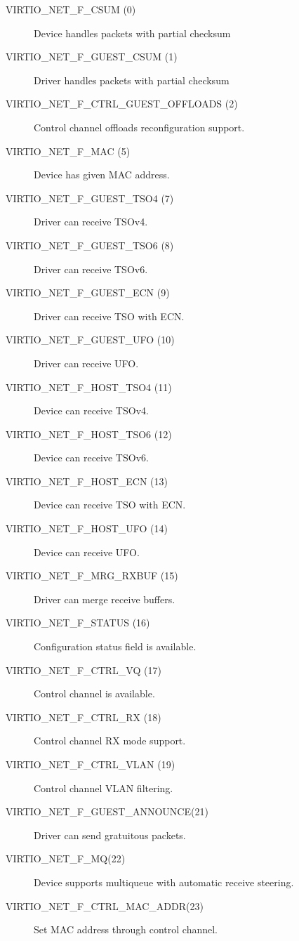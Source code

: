 \begin{description}
\item[VIRTIO_NET_F_CSUM (0)] Device handles packets with partial checksum

\item[VIRTIO_NET_F_GUEST_CSUM (1)] Driver handles packets with partial checksum

\item[VIRTIO_NET_F_CTRL_GUEST_OFFLOADS (2)] Control channel offloads
        reconfiguration support.

\item[VIRTIO_NET_F_MAC (5)] Device has given MAC address.

\item[VIRTIO_NET_F_GUEST_TSO4 (7)] Driver can receive TSOv4.

\item[VIRTIO_NET_F_GUEST_TSO6 (8)] Driver can receive TSOv6.

\item[VIRTIO_NET_F_GUEST_ECN (9)] Driver can receive TSO with ECN.

\item[VIRTIO_NET_F_GUEST_UFO (10)] Driver can receive UFO.

\item[VIRTIO_NET_F_HOST_TSO4 (11)] Device can receive TSOv4.

\item[VIRTIO_NET_F_HOST_TSO6 (12)] Device can receive TSOv6.

\item[VIRTIO_NET_F_HOST_ECN (13)] Device can receive TSO with ECN.

\item[VIRTIO_NET_F_HOST_UFO (14)] Device can receive UFO.

\item[VIRTIO_NET_F_MRG_RXBUF (15)] Driver can merge receive buffers.

\item[VIRTIO_NET_F_STATUS (16)] Configuration status field is
    available.

\item[VIRTIO_NET_F_CTRL_VQ (17)] Control channel is available.

\item[VIRTIO_NET_F_CTRL_RX (18)] Control channel RX mode support.

\item[VIRTIO_NET_F_CTRL_VLAN (19)] Control channel VLAN filtering.

\item[VIRTIO_NET_F_GUEST_ANNOUNCE(21)] Driver can send gratuitous
    packets.

\item[VIRTIO_NET_F_MQ(22)] Device supports multiqueue with automatic
    receive steering.

\item[VIRTIO_NET_F_CTRL_MAC_ADDR(23)] Set MAC address through control
    channel.
\end{description}

